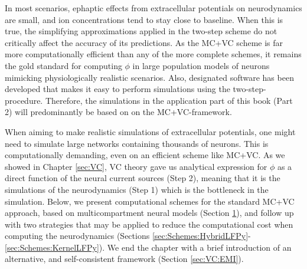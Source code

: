 In most scenarios, ephaptic effects from extracellular potentials on neurodynamics are small, and ion concentrations tend to stay close to baseline. When this is true, the simplifying approximations applied in the two-step scheme do not critically affect the accuracy of its predictions. As the MC+VC scheme is far more computationally efficient than any of the more complete schemes, it remains the gold standard for computing $\phi$ in large population models of neurons mimicking physiologically realistic scenarios. Also, designated software has been developed that makes it easy to perform simulations using the two-step-procedure. Therefore, the simulations in the application part of this book (Part 2) will predominantly be based on on the MC+VC-framework.

When aiming to make realistic simulations of extracellular potentials, one might need to simulate large networks containing thousands of neurons. This is computationally demanding, even on an efficient scheme like MC+VC. 
As we showed in Chapter \ref{sec:VC}, 
VC theory gave us  analytical expression for $\phi$ as a direct function of the neural current sources (Step 2), meaning that it is  the simulations of the neurodynamics (Step 1) which is the bottleneck in the simulation. Below, we present computational schemes for the standard MC+VC approach, based on multicompartment neural models (Section \ref{sec:Schemes:LFPy}), and follow up with two strategies that may be applied to reduce the computational cost when computing the neurodynamics (Sections \ref{sec:Schemes:HybridLFPy}-\ref{sec:Schemes:KernelLFPy}). We end the chapter with a brief introduction of an alternative, and self-consistent framework (Section \ref{sec:VC:EMI}).





\section{}
\label{sec:Schemes:LFPy}

